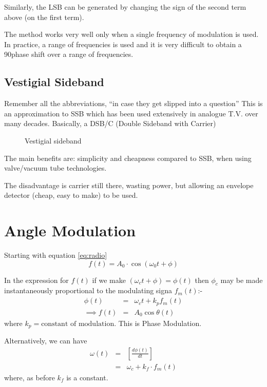 \documentclass[11pt]{article} %
\begin{document}
	Similarly, the LSB can be generated by changing the sign of the second term above (on the first term).

	The method works very well only when a single frequency of modulation is used. In practice, a range of frequencies is used and it is very difficult to obtain a 90\textdegree phase shift over a range of frequencies.

	\subsection{Vestigial Sideband}
		Remember all the abbreviations, ``in case they get slipped into a question''
		This is an approximation to SSB which has been used extensively in analogue T.V. over many decades. Basically, a DSB/C (Double Sideband with Carrier)

		\begin{figure}[h]
			\centering
			\begin{tikzpicture}
				
			\end{tikzpicture}
			\caption{Vestigial sideband}
		\end{figure}

		The main benefits are: simplicity and cheapness compared to SSB, when using valve/vacuum tube technologies.

		The disadvantage is carrier still there, wasting power, but allowing an envelope detector (cheap, easy to make) to be used.

\section{Angle Modulation}
	Starting with equation \ref{eq:radio}
	\begin{equation}
		f(t) = A_0 \cdot \cos\left(\omega_0t+\phi\right)
	\end{equation}

	In the expression for $f(t)$ if we make $(\omega_ct+\phi)=\phi(t)$ then $\phi_c$ may be made instantaneously proportional to the modulating signa $f_m(t)$:-
	\begin{eqnarray}
		\phi\left(t\right) &=&  \omega_ct+k_p f_m(t) \nonumber \\
		\implies f(t) &=& A_0 \cos\theta(t)
	\end{eqnarray}
	where $k_p = \mbox{constant of modulation}$. This is Phase Modulation.

	Alternatively, we can have 
	\begin{eqnarray}
		\omega(t) &=& \left[\frac{d\phi(t)}{dt}\right] \nonumber \\
		&=& \omega_c + k_f \cdot f_m(t)
	\end{eqnarray}
	where, as before $k_f$ is a constant.
\end{document}
